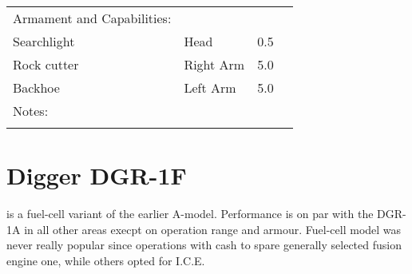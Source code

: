 \documentclass{tufte-book}
\begin{document}
\begin{minipage}{\textwidth}
\begin{center}
\begin{tabular}{llll}
Armament and Capabilities: & & \\
\quad Searchlight & Head & 0.5 \\
\quad Rock cutter & Right Arm & 5.0 \\
\quad Backhoe & Left Arm & 5.0 \\

Notes: & & \\
\multicolumn{3}{l}{\quad } \\

\bottomrule
\end{tabular}
\end{center}
\end{minipage}


\clearpage
\section{Digger DGR-1F}
 is a fuel-cell variant of the earlier A-model.
Performance is on par with the DGR-1A in all other areas
execpt on operation range and armour. Fuel-cell model was never really
popular since operations with cash to spare generally selected fusion
engine one, while others opted for I.C.E.

\end{document}

